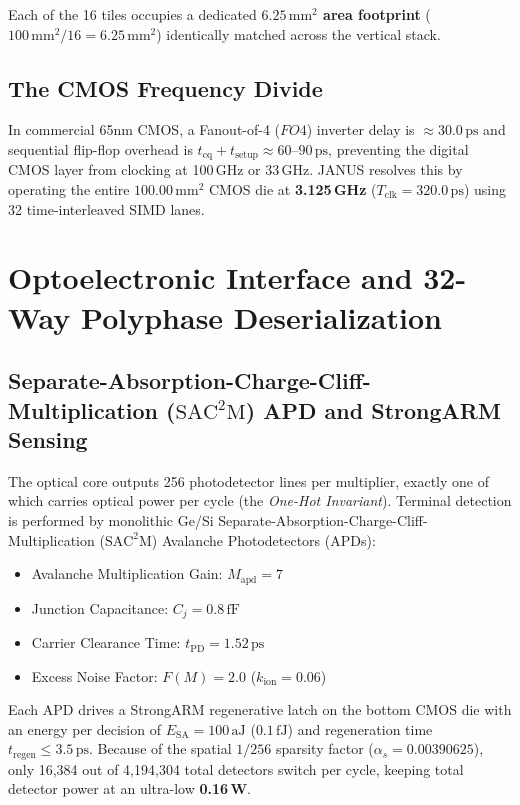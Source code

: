 \documentclass[10pt,journal,compsoc]{IEEEtran}
\begin{document}
Each of the 16 tiles occupies a dedicated \textbf{$6.25\,\text{mm}^2$ area footprint} ($100\,\text{mm}^2 / 16 = 6.25\,\text{mm}^2$) identically matched across the vertical stack.

\subsection{The CMOS Frequency Divide}
In commercial 65nm CMOS, a Fanout-of-4 ($FO4$) inverter delay is $\approx 30.0\,\text{ps}$ and sequential flip-flop overhead is $t_{\text{cq}} + t_{\text{setup}} \approx 60\text{--}90\,\text{ps}$, preventing the digital CMOS layer from clocking at 100\,GHz or 33\,GHz. JANUS resolves this by operating the entire $100.00\,\text{mm}^2$ CMOS die at \textbf{3.125\,GHz} ($T_{\text{clk}} = 320.0\,\text{ps}$) using 32 time-interleaved SIMD lanes.

\section{Optoelectronic Interface and 32-Way Polyphase Deserialization}\label{sec:optoelectronic}

\subsection{Separate-Absorption-Charge-Cliff-Multiplication ($\mathrm{SAC^2M}$) APD and StrongARM Sensing}
The optical core outputs 256 photodetector lines per multiplier, exactly one of which carries optical power per cycle (the \textit{One-Hot Invariant}). Terminal detection is performed by monolithic Ge/Si Separate-Absorption-Charge-Cliff-Multiplication ($\mathrm{SAC^2M}$) Avalanche Photodetectors (APDs):
\begin{itemize}
    \item Avalanche Multiplication Gain: $M_{\text{apd}} = 7$
    \item Junction Capacitance: $C_j = 0.8\,\text{fF}$
    \item Carrier Clearance Time: $t_{\text{PD}} = 1.52\,\text{ps}$
    \item Excess Noise Factor: $F(M) = 2.0$ ($k_{\text{ion}} = 0.06$)
\end{itemize}

Each APD drives a StrongARM regenerative latch \cite{razavi2015strongarm} on the bottom CMOS die with an energy per decision of $E_{\text{SA}} = 100\,\text{aJ}$ ($0.1\,\text{fJ}$) and regeneration time $t_{\text{regen}} \le 3.5\,\text{ps}$. Because of the spatial $1/256$ sparsity factor ($\alpha_s = 0.00390625$), only 16,384 out of 4,194,304 total detectors switch per cycle, keeping total detector power at an ultra-low \textbf{0.16\,W}.
\end{document}
